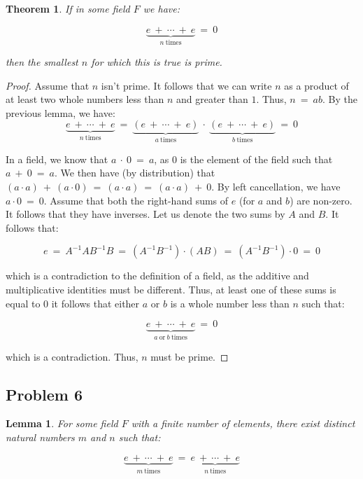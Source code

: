 \documentclass[10pt, oneside]{article}
\newtheorem{thm}{Theorem}
\newtheorem{lem}{Lemma}
\begin{document}
\begin{thm}
	If in some field $F$ we have:

	$$\underbrace{e \ + \ \cdots \ + \ e}_{n \ \text{times}} \ = \ 0$$

	then the smallest $n$ for which this is true is prime.
\end{thm}

\begin{proof}
	Assume that $n$ isn't prime. It follows that we can write $n$ as a product of at least two whole numbers 
	less than $n$ and greater than $1$. Thus, $n \ = \ ab$. By the previous lemma, we have:
\newpage	
	$$\underbrace{e \ + \ \cdots \ + \ e}_{n \ \text{times}} \ = \ \underbrace{(e \ + \ \cdots \ + \ e)}_{a \ \text{times}} \ \cdot \ \underbrace{(e \ + \ 
	  \cdots \ + \ e)}_{b \ \text{times}} \ = \ 0$$

  In a field, we know that $a \ \cdot \ 0 \ = \ a$, as $0$ is the element of the field such that $a \ + \ 0 \ = \ a$. We then have (by distribution) that
  $(a \cdot a) \ + \ (a \cdot 0) \ = \ (a \cdot a) \ = \ (a \cdot a) \ + \ 0$. By left cancellation, we have $a \cdot 0 \ = \ 0$. Assume that both the right-hand sums
  of $e$ (for $a$ and $b$) are non-zero. It follows that they have inverses. Let us denote the two sums by $A$ and $B$. It follows that:

  $$e \ = \ A^{-1} A B^{-1} B \ = \ (A^{-1} B^{-1}) \cdot (A B) \ = \ (A^{-1} B^{-1}) \cdot 0 \ = \ 0$$

  which is a contradiction to the definition of a field, as the additive and multiplicative identities must be different. Thus, at least one of these sums is equal to $0$ it follows that either $a$ or $b$ is a whole number
  less than $n$ such that:

  $$\underbrace{e \ + \ \cdots \ + \ e}_{a \ \text{or} \ b \ \text{times}} \ = \ 0$$

  which is a contradiction. Thus, $n$ must be prime.

\end{proof}

\subsection{Problem 6}

\begin{lem}
  For some field $F$ with a finite number of elements, there exist distinct natural numbers $m$ and $n$ such that:

  $$\underbrace{e \ + \ \cdots \ + \ e}_{m \ \text{times}} \ = \ \underbrace{e \ + \ \cdots \ + \ e}_{n \ \text{times}}$$
\end{lem}
\end{document}
